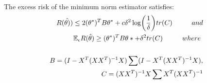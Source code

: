 \documentclass[a4paper,12pt]{scrartcl}
\theoremstyle{definition}
\begin{document}
\begin{thm}\ \\
The excess risk of the minimum norm estimator satisfies:
\begin{equation}
\begin{aligned}
R(\hat{\theta)}) \leq 2(\theta^*)^TB\theta^* + c\delta^2\log(\frac{1}{\delta})tr(C) \hspace*{1cm}and \\
\mathbb{E}_\epsilon R(\hat{\theta}) \geq (\theta^*)^TB\theta* + \delta^2tr(C) \hspace*{1cm} where\ \\\\
\vspace*{0.5cm} B = (I - X^T(XX^T)^{-1}X)\sum(I - X^T(XX^T)^{-1}X),  \\
C = (XX^T)^{-1}X\sum X^T(XX^T)^{-1}
\end{aligned}
\end{equation} 

\end{thm}
\end{document}
